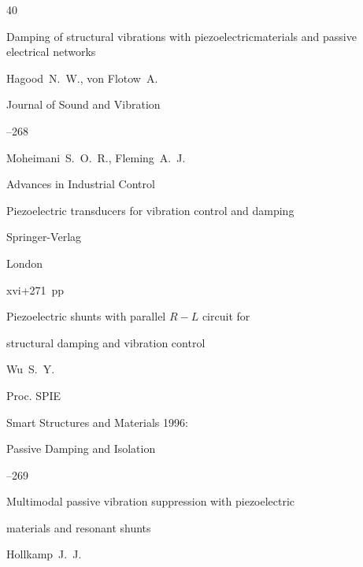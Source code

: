 \RusRef

\begin{thebibliography}{40}




\paper Damping of structural vibrations with piezoelectricmaterials and passive electrical networks

\by Hagood~N.~W., von Flotow~A.

\jour Journal of Sound and Vibration 




--268






\by Moheimani~S.~O.~R., Fleming~A.~J.

\serial Advances in Industrial Control

\book Piezoelectric transducers for vibration control and damping

\publ Springer-Verlag

\publaddr London


\totalpages xvi+271~pp \nofrills




\paper Piezoelectric shunts with parallel $R-L$ circuit for

structural damping and vibration control

\by Wu~S.~Y.

\jour Proc. SPIE 

\volinfo Smart Structures and Materials 1996:

Passive Damping and Isolation



--269





\paper Multimodal passive vibration suppression with piezoelectric

materials and resonant shunts

\by Hollkamp~J.~J.


\end{thebibliography}
